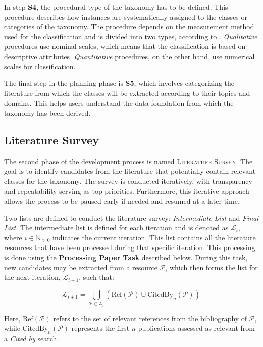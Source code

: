 In step \textbf{S4}, the procedural type of the taxonomy has to be defined. This procedure describes how instances are systematically assigned to the classes or categories of the taxonomy. The procedure depends on the measurement method used for the classification and is divided into two types, according to \textcite{usman_taxonomies_2017}. \emph{Qualitative} procedures use nominal scales, which means that the classification is based on descriptive attributes. \emph{Quantitative} procedures, on the other hand, use numerical scales for classification.

The final step in the planning phase is \textbf{S5}, which involves categorizing the literature from which the classes will be extracted according to their topics and domains. This helps users understand the data foundation from which the taxonomy has been derived.

\subsection{Literature Survey}
\label{sec:tax_con_literature_survey}

The second phase of the development process is named \textsc{Literature Survey}. The goal is to identify candidates from the literature that potentially contain relevant classes for the taxonomy. The survey is conducted iteratively, with transparency and repeatability serving as top priorities. Furthermore, this iterative approach allows the process to be paused early if needed and resumed at a later time. 

Two lists are defined to conduct the literature survey: \emph{Intermediate List} and \emph{Final List}. The intermediate list is defined for each iteration and is denoted as $\mathcal{L}_i$, where $i \in \mathbb{N}_{>0}$ indicates the current iteration. This list contains all the literature resources that have been processed during that specific iteration. This processing is done using the \hyperref[enum:processing_paper_task]{\textbf{Processing Paper Task}} described below. During this task, new candidates may be extracted from a resource $\mathcal{P}$, which then forms the list for the next iteration, $\mathcal{L}_{i+1}$, such that:

\[
\mathcal{L}_{i+1} = \bigcup_{\mathcal{P} \in \mathcal{L}_i} \left( \text{Ref}(\mathcal{P}) \cup \text{CitedBy}_n(\mathcal{P}) \right)
\]

Here, $\text{Ref}(\mathcal{P})$ refers to the set of relevant references from the bibliography of $\mathcal{P}$, while $\text{CitedBy}_n(\mathcal{P})$ represents the first $n$ publications assessed as relevant from a \emph{Cited by} search. 

